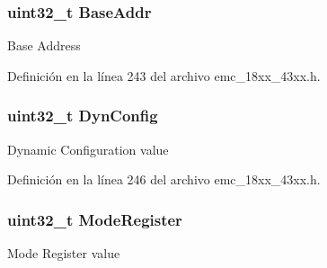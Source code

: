 \subsubsection[{\texorpdfstring{Base\+Addr}{BaseAddr}}]{\setlength{\rightskip}{0pt plus 5cm}uint32\+\_\+t Base\+Addr}\hypertarget{struct_i_p___e_m_c___d_y_n___d_e_v_i_c_e___c_o_n_f_i_g___t_adf081f84496165c1cfcf4953f668f07a}{}\label{struct_i_p___e_m_c___d_y_n___d_e_v_i_c_e___c_o_n_f_i_g___t_adf081f84496165c1cfcf4953f668f07a}
Base Address 

Definición en la línea 243 del archivo emc\+\_\+18xx\+\_\+43xx.\+h.

\subsubsection[{\texorpdfstring{Dyn\+Config}{DynConfig}}]{\setlength{\rightskip}{0pt plus 5cm}uint32\+\_\+t Dyn\+Config}\hypertarget{struct_i_p___e_m_c___d_y_n___d_e_v_i_c_e___c_o_n_f_i_g___t_a5960a73b3f9e123ddd508c250f77d984}{}\label{struct_i_p___e_m_c___d_y_n___d_e_v_i_c_e___c_o_n_f_i_g___t_a5960a73b3f9e123ddd508c250f77d984}
Dynamic Configuration value 

Definición en la línea 246 del archivo emc\+\_\+18xx\+\_\+43xx.\+h.

\subsubsection[{\texorpdfstring{Mode\+Register}{ModeRegister}}]{\setlength{\rightskip}{0pt plus 5cm}uint32\+\_\+t Mode\+Register}\hypertarget{struct_i_p___e_m_c___d_y_n___d_e_v_i_c_e___c_o_n_f_i_g___t_acca66c64c7b5806d9c62078fa6702021}{}\label{struct_i_p___e_m_c___d_y_n___d_e_v_i_c_e___c_o_n_f_i_g___t_acca66c64c7b5806d9c62078fa6702021}
Mode Register value 

